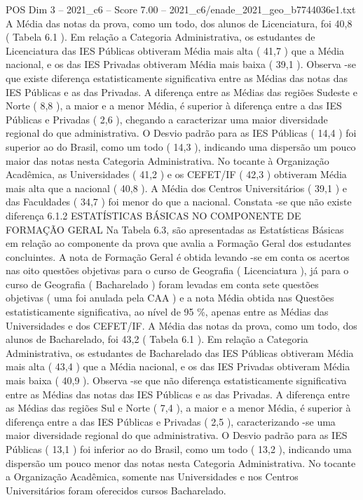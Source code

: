\begin{textsample}{POS Dim 3 – 2021\_c6 – Score 7.00 – 2021\_c6/enade\_2021\_geo\_b7744036e1.txt}
A Média das notas da prova, como um todo, dos alunos de Licenciatura, foi 40,8 ( Tabela 6.1 ).
Em relação a Categoria Administrativa, os estudantes de Licenciatura das IES Públicas obtiveram Média mais alta ( 41,7 ) que a Média nacional, e os das IES Privadas obtiveram Média mais baixa ( 39,1 ).
Observa -se que existe diferença estatisticamente significativa entre as Médias das notas das IES Públicas e as das Privadas.
A diferença entre as Médias das regiões Sudeste e Norte ( 8,8 ), a maior e a menor Média, é superior à diferença entre a das IES Públicas e Privadas ( 2,6 ), chegando a caracterizar uma maior diversidade regional do que administrativa.
O Desvio padrão para as IES Públicas ( 14,4 ) foi superior ao do Brasil, como um todo ( 14,3 ), indicando uma dispersão um pouco maior das notas nesta Categoria Administrativa.
No tocante à Organização Acadêmica, as Universidades ( 41,2 ) e os CEFET/IF ( 42,3 ) obtiveram Média mais alta que a nacional ( 40,8 ).
A Média dos Centros Universitários ( 39,1 ) e das Faculdades ( 34,7 ) foi menor do que a nacional.
Constata -se que não existe diferença 6.1.2 ESTATÍSTICAS BÁSICAS NO COMPONENTE DE FORMAÇÃO GERAL Na Tabela 6.3, são apresentadas as Estatísticas Básicas em relação ao componente da prova que avalia a Formação Geral dos estudantes concluintes.
A nota de Formação Geral é obtida levando -se em conta os acertos nas oito questões objetivas para o curso de Geografia ( Licenciatura ), já para o curso de Geografia ( Bacharelado ) foram levadas em conta sete questões objetivas ( uma foi anulada pela CAA ) e a nota Média obtida nas Questões estatisticamente significativa, ao nível de 95 \%, apenas entre as Médias das Universidades e dos CEFET/IF.
A Média das notas da prova, como um todo, dos alunos de Bacharelado, foi 43,2 ( Tabela 6.1 ).
Em relação a Categoria Administrativa, os estudantes de Bacharelado das IES Públicas obtiveram Média mais alta ( 43,4 ) que a Média nacional, e os das IES Privadas obtiveram Média mais baixa ( 40,9 ).
Observa -se que não diferença estatisticamente significativa entre as Médias das notas das IES Públicas e as das Privadas.
A diferença entre as Médias das regiões Sul e Norte ( 7,4 ), a maior e a menor Média, é superior à diferença entre a das IES Públicas e Privadas ( 2,5 ), caracterizando -se uma maior diversidade regional do que administrativa.
O Desvio padrão para as IES Públicas ( 13,1 ) foi inferior ao do Brasil, como um todo ( 13,2 ), indicando uma dispersão um pouco menor das notas nesta Categoria Administrativa.
No tocante a Organização Acadêmica, somente nas Universidades e nos Centros Universitários foram oferecidos cursos Bacharelado.

\end{textsample}
